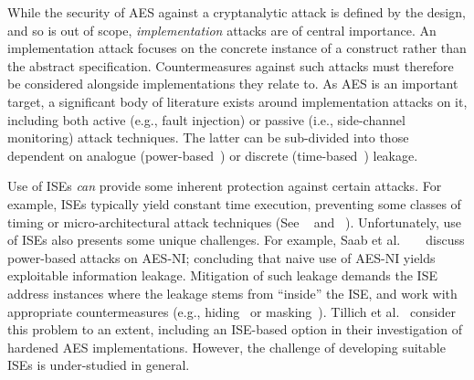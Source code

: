 
While the security of AES against a cryptanalytic attack is defined by
the design, and so is out of scope, {\em implementation} attacks are
of central importance.
An implementation attack focuses on the concrete instance of a construct
rather than the abstract specification.
Countermeasures against such attacks must therefore be
considered alongside implementations they relate to.
As AES is an important target, a significant body of literature exists
around implementation attacks on it, including both
 active (e.g., fault injection)
or
passive (i.e., side-channel monitoring)
attack techniques.
The latter can be sub-divided into those dependent on
analogue
(power-based~\cite{ManOswPop:07})
or
discrete 
(time-based~\cite{KoeQui:99})
leakage.

Use of ISEs
{\em can} provide some inherent protection against certain attacks.
For example,
ISEs typically yield constant time execution,
preventing some classes of timing or micro-architectural
attack techniques
(See ~\cite[Section 4]{Szefer:19} and ~\cite[Section 4]{GYCH:18}).
Unfortunately,
use of ISEs also presents some unique challenges.
For example, 
Saab et al. ~ ~\cite{SaaRohHam:16}
discuss power-based attacks on AES-NI; concluding
that naive use of AES-NI yields exploitable information leakage.
Mitigation of such leakage demands the ISE
address instances where the leakage stems from ``inside'' the ISE,
and work with appropriate countermeasures
(e.g., hiding~\cite[Chapter 7]{ManOswPop:07} or masking~\cite[Chapter 10]{ManOswPop:07}).
Tillich et al.~\cite{TilHerMan:07}
consider this problem to an extent, including an ISE-based option in
their investigation of hardened AES implementations. However, the challenge
of developing suitable ISEs is under-studied in general.

